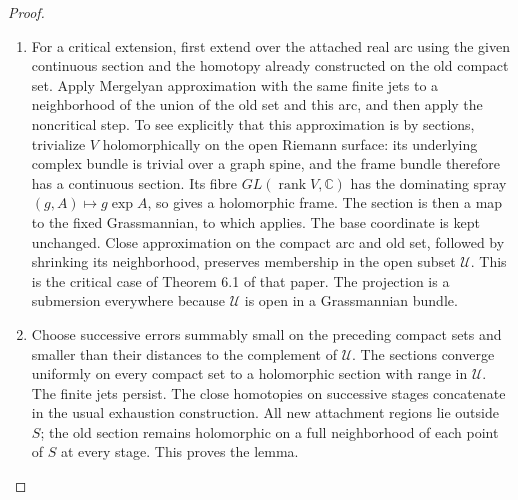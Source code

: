 \documentclass[11pt,a4paper]{article}
\numberwithin{equation}{section}
\theoremstyle{definition}
\begin{document}
\begin{proof}
\begin{enumerate}[label=\arabic*.]
\item For a critical extension, first extend over the attached real
arc using the given continuous section and the homotopy already
constructed on the old compact set.  Apply Mergelyan
approximation with the same finite jets to a neighborhood of
the union of the old set and this arc, and then apply the
noncritical step.  To see explicitly that this approximation
is by sections, trivialize $V$ holomorphically on the open
Riemann surface: its underlying complex bundle is trivial over
a graph spine, and the frame bundle therefore has a continuous
section.  Its fibre $GL(\operatorname{rank}V,\mathbb C)$ has
the dominating spray $(g,A)\mapsto g\exp A$, so
\cite[Theorem 1.2, preprint p.~3]{ffForstnericPrezelj02} gives a holomorphic
frame.  The section is then a map to the
fixed Grassmannian, to which
\cite[Theorem 2.13, p.~9]{IVVOkaOneV5} applies.  The base
coordinate is kept unchanged.  Close approximation on the
compact arc and old set, followed by shrinking its
neighborhood, preserves membership in the open subset
$\mathscr U$.  This is the critical case of Theorem 6.1 of that paper. The
projection is a submersion everywhere because $\mathscr U$ is
open in a Grassmannian bundle.

\item Choose successive errors summably small on the preceding
compact sets and smaller than their distances to the complement
of $\mathscr U$.  The sections converge uniformly on every
compact set to a holomorphic section with range in
$\mathscr U$.  The finite jets persist.  The close homotopies
on successive stages concatenate in the usual exhaustion
construction.  All new attachment regions lie outside $S$;
the old section remains holomorphic on a full neighborhood of
each point of $S$ at every stage.  This proves the lemma.

\end{enumerate}
\end{proof}
\end{document}
